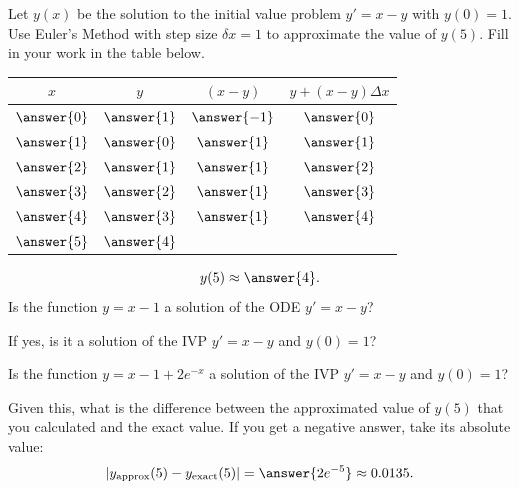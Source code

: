 \documentclass{ximera}
\begin{document}
\begin{exercise}
Let $y(x)$ be the solution to the initial value problem $y' = x-y$ with $y(0) = 1$. Use Euler's Method with step size $\delta x = 1$ to approximate the value of $y(5)$. Fill in your work in the table below.
\begin{center}
\begin{tabular}{cccc}
$x$ & $y$ & $(x - y)$ & $y + (x - y) \Delta x$ \\
\hline
$\answer{0}$ & $\answer{1}$ & $\answer{-1}$ & $\answer{0}$ \\
$\answer{1}$ & $\answer{0}$ & $\answer{1}$ & $\answer{1}$ \\
$\answer{2}$ & $\answer{1}$ & $\answer{1}$ & $\answer{2}$ \\
$\answer{3}$ & $\answer{2}$ & $\answer{1}$ & $\answer{3}$ \\
$\answer{4}$ & $\answer{3}$ & $\answer{1}$ & $\answer{4}$  \\
$\answer{5}$ & $\answer{4}$
\end{tabular}
\end{center}
\[ y(5) \approx \answer{4}. \]
Is the function $y = x-1$ a solution of the ODE $y' = x-y$?
\begin{multipleChoice}
\end{multipleChoice}
If yes, is it a solution of the IVP $y' = x-y$ and $y(0) = 1$?
\begin{multipleChoice}
\end{multipleChoice}
Is the function $y = x -1 + 2 e^{-x}$ a solution of the IVP $y' = x-y$ and $y(0) = 1$?
\begin{multipleChoice}
\end{multipleChoice}
Given this, what is the difference between the approximated value of $y(5)$ that you calculated and the exact value. If you get a negative answer, take its absolute value:
\[ | y_{\text{approx}}(5) - y_{\text{exact}}(5)| = \answer{2 e^{-5}} \approx 0.0135. \]
\end{exercise}
\end{document}
